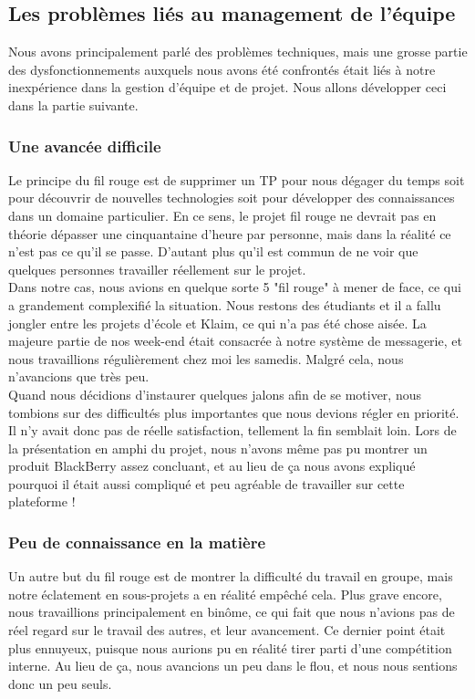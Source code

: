 \documentclass{article}
\begin{document}
	\subsection{Les problèmes liés au management de l'équipe}

	Nous avons principalement parlé des problèmes techniques, mais une grosse partie des dysfonctionnements auxquels nous avons été confrontés était liés à notre inexpérience dans la gestion d'équipe et de projet. Nous allons développer ceci dans la partie suivante. 
	
		\subsubsection{Une avancée difficile}
		Le principe du fil rouge est de supprimer un TP pour nous dégager du temps soit pour découvrir de nouvelles technologies soit pour développer des connaissances dans un domaine particulier. En ce sens, le projet fil rouge ne devrait pas en théorie dépasser une cinquantaine d'heure par personne, mais dans la réalité ce n'est pas ce qu'il se passe. D'autant plus qu'il est commun de ne voir que quelques personnes travailler réellement sur le projet. \\
		
		Dans notre cas, nous avions en quelque sorte 5 "fil rouge" à mener de face, ce qui a grandement complexifié la situation. Nous restons des étudiants et il a fallu jongler entre les projets d'école et Klaim, ce qui n'a pas été chose aisée. La majeure partie de nos week-end était consacrée à notre système de messagerie, et nous travaillions régulièrement chez moi les samedis. Malgré cela, nous n'avancions que très peu.\\ 
		
		Quand nous décidions d'instaurer quelques jalons afin de se motiver, nous tombions sur des difficultés plus importantes que nous devions régler en priorité. Il n'y avait donc pas de réelle satisfaction, tellement la fin semblait loin. Lors de la présentation en amphi du projet, nous n'avons même pas pu montrer un produit BlackBerry assez concluant, et au lieu de ça nous avons expliqué pourquoi il était aussi compliqué et peu agréable de travailler sur cette plateforme ! \\
		
		\subsubsection{Peu de connaissance en la matière}
		Un autre but du fil rouge est de montrer la difficulté du travail en groupe, mais notre éclatement en sous-projets a en réalité empêché cela. Plus grave encore, nous travaillions principalement en binôme, ce qui fait que nous n'avions pas de réel regard sur le travail des autres, et leur avancement. Ce dernier point était plus ennuyeux, puisque nous aurions pu en réalité tirer parti d'une compétition interne. Au lieu de ça, nous avancions un peu dans le flou, et nous nous sentions donc un peu seuls.\\
		
\end{document}
